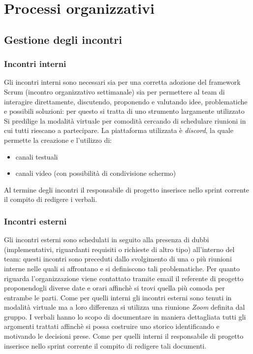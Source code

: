 \section{Processi organizzativi}
    \subsection{Gestione degli incontri}
        \subsubsection{Incontri interni}
        Gli incontri interni sono necessari sia per una corretta adozione del framework Scrum (incontro organizzativo settimanale)
        sia per permettere al team di interagire direttamente, discutendo, proponendo e valutando idee, problematiche e possibili 
        soluzioni: per questo si tratta di uno strumento largamente utilizzato
        \newline
        Si predilige la modalità virtuale per comodità cercando di schedulare riunioni in cui tutti riescano a partecipare.
        \newline
        La piattaforma utilizzata è \textit{discord}, la quale permette la creazione e l'utilizzo di:
        \begin{itemize}
            \item canali testuali
            \item canali video (con possibilità di condivisione schermo)
        \end{itemize}
        Al termine degli incontri il responsabile di progetto inserisce nello sprint corrente il compito di redigere i verbali. 

        \subsubsection{Incontri esterni}
        Gli incontri esterni sono schedulati in seguito alla presenza di dubbi (implementativi, riguardanti requisiti o richieste di altro tipo) all'interno del 
        team: questi incontri sono preceduti dallo svolgimento di una o più riunioni interne nelle quali si affrontano e si definiscono tali problematiche.
        \newline
        Per quanto riguarda l'organizzazione viene contattato tramite email il referente di progetto proponendogli diverse date e orari affinchè si trovi quella 
        più comoda per entrambe le parti. 
        \newline
        Come per quelli interni gli incontri esterni sono tenuti in modalità virtuale ma a loro differenza si utilizza una riunione \textit{Zoom} definita dal gruppo. 
        \newline
        I verbali hanno lo scopo di documentare in maniera dettagliata tutti gli argomenti trattati affinchè si possa costruire uno storico identificando
        e motivando le decisioni prese.
        \newline
        Come per quelli interni il responsabile di progetto inserisce nello sprint corrente il compito di redigere tali documenti.

